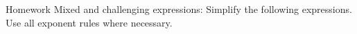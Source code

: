 \documentclass[12pt, a4paper, addpoints]{exam}
\begin{document}
\begin{questions}
\begin{multicols}{5}
\end{multicols}


\question Homework Mixed and challenging expressions:
Simplify the following expressions. Use all exponent rules where necessary.


\end{questions}
\end{document}

